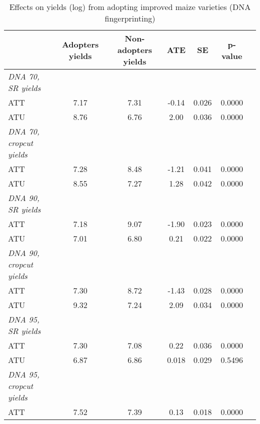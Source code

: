 \begin{table}[H]
\centering
\hspace*{-1.2cm}
\begin{threeparttable}
\caption{Effects on yields (log) from adopting improved maize varieties (DNA fingerprinting)}
\label{tab:switch2}
\begin{tabular}{l cccccc}
\hline
\hline
            &Adopters yields&Non-adopters yields&         ATE&          SE&     p-value\\
\hline
\textit{DNA 70, SR yields}&            &            &            &            &            \\
ATT         &        7.17&        7.31&       -0.14&       0.026&      0.0000\\
%
%
%
ATU         &        8.76&        6.76&        2.00&       0.036&      0.0000\\
%
%
%
\textit{DNA 70, cropcut yields}&            &            &            &            &            \\
ATT         &        7.28&        8.48&       -1.21&       0.041&      0.0000\\
%
%
%
ATU         &        8.55&        7.27&        1.28&       0.042&      0.0000\\
%
%
%
\textit{DNA 90, SR yields}&            &            &            &            &            \\
ATT         &        7.18&        9.07&       -1.90&       0.023&      0.0000\\
%
%
%
ATU         &        7.01&        6.80&        0.21&       0.022&      0.0000\\
%
%
%
\textit{DNA 90, cropcut yields}&            &            &            &            &            \\
ATT         &        7.30&        8.72&       -1.43&       0.028&      0.0000\\
%
%
%
ATU         &        9.32&        7.24&        2.09&       0.034&      0.0000\\
%
%
%
\textit{DNA 95, SR yields}&            &            &            &            &            \\
ATT         &        7.30&        7.08&        0.22&       0.036&      0.0000\\
%
%
%
ATU         &        6.87&        6.86&       0.018&       0.029&      0.5496\\
%
%
%
\textit{DNA 95, cropcut yields}&            &            &            &            &            \\
ATT         &        7.52&        7.39&        0.13&       0.018&      0.0000\\

\end{tabular}
\end{threeparttable}
\end{table}
